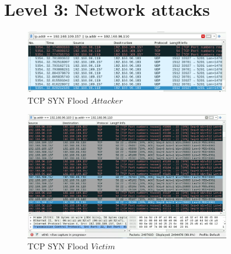 \chapter{Level 3: Network attacks}

\begin{figure}[H]
\centering
\includegraphics[width=0.8\textwidth]{img/level3/level3-attacker-TCPSYNFlood-pov.png}
\caption{TCP SYN Flood \(Attacker\)}\label{fig:TCPSYNFloodAttackerPOV}
\end{figure}

\begin{figure}[H]
\centering
\includegraphics[width=0.8\textwidth]{img/level3/level3-victim1-TCPSYNFlood-pov.png}
\caption{TCP SYN Flood \(Victim\)}\label{fig:TCPSYNFloodVictimPOV}
\end{figure}